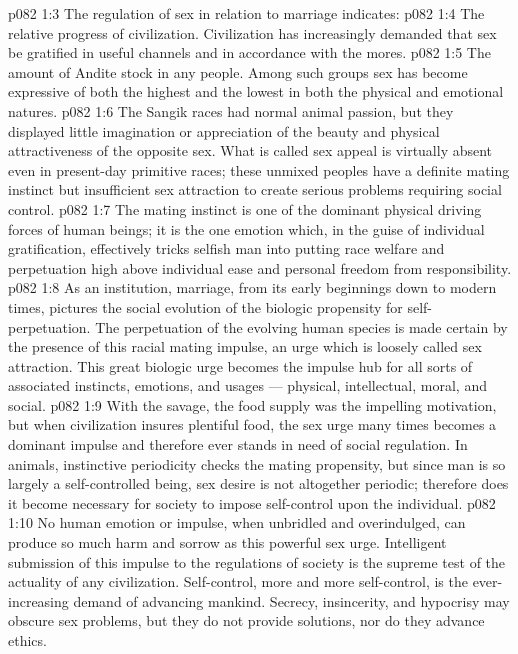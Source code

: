 \vs p082 1:3 \pc The regulation of sex in relation to marriage indicates:
\vs p082 1:4 \bibnobreakspace The relative progress of civilization. Civilization has increasingly demanded that sex be gratified in useful channels and in accordance with the mores.
\vs p082 1:5 \pc {}\bibnobreakspace The amount of Andite stock in any people. Among such groups sex has become expressive of both the highest and the lowest in both the physical and emotional natures.
\vs p082 1:6 \pc The Sangik races had normal animal passion, but they displayed little imagination or appreciation of the beauty and physical attractiveness of the opposite sex. What is called sex appeal is virtually absent even in present\hyp{}day primitive races; these unmixed peoples have a definite mating instinct but insufficient sex attraction to create serious problems requiring social control.
\vs p082 1:7 The mating instinct is one of the dominant physical driving forces of human beings; it is the one emotion which, in the guise of individual gratification, effectively tricks selfish man into putting race welfare and perpetuation high above individual ease and personal freedom from responsibility.
\vs p082 1:8 As an institution, marriage, from its early beginnings down to modern times, pictures the social evolution of the biologic propensity for self\hyp{}perpetuation. The perpetuation of the evolving human species is made certain by the presence of this racial mating impulse, an urge which is loosely called sex attraction. This great biologic urge becomes the impulse hub for all sorts of associated instincts, emotions, and usages --- physical, intellectual, moral, and social.
\vs p082 1:9 With the savage, the food supply was the impelling motivation, but when civilization insures plentiful food, the sex urge many times becomes a dominant impulse and therefore ever stands in need of social regulation. In animals, instinctive periodicity checks the mating propensity, but since man is so largely a self\hyp{}controlled being, sex desire is not altogether periodic; therefore does it become necessary for society to impose self\hyp{}control upon the individual.
\vs p082 1:10 No human emotion or impulse, when unbridled and overindulged, can produce so much harm and sorrow as this powerful sex urge. Intelligent submission of this impulse to the regulations of society is the supreme test of the actuality of any civilization. Self\hyp{}control, more and more self\hyp{}control, is the ever\hyp{}increasing demand of advancing mankind. Secrecy, insincerity, and hypocrisy may obscure sex problems, but they do not provide solutions, nor do they advance ethics.
